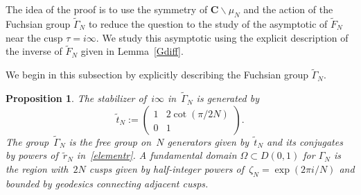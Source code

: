 \documentclass[10pt]{amsart}
\renewcommand\setminus{\smallsetminus}
\def\wGamma{\widetilde{\Gamma}}
\def\wF{\widetilde{F}}
\def\wr{\widetilde{r}}
\def\wt{\widetilde{t}}
\def\SO{\mathrm{SO}}
\def\R{\mathbf{R}}
\newtheorem{proposition}[subsubsection]{Proposition}
\theoremstyle{remark}
\numberwithin{equation}{subsection}
\def\numequation{\addtocounter{subsubsection}{1}\begin{equation}}
\def\C{\mathbf{C}}
\begin{document}
The idea of the proof is to use the symmetry of $\C\setminus \mu_N$ and the action of the Fuchsian group $\wGamma_N$ to reduce the question to the study of the asymptotic of $\wF_N$ near the cusp $\tau= i \infty$. We study this asymptotic using the explicit description of the inverse of $\wF_N$ given in Lemma~\ref{Gdiff}. 

We begin in this subsection by explicitly describing the Fuchsian group $\wGamma_N$. 



\begin{proposition}\label{prop-GammaN}
The stabilizer of~$i \infty$ in~$\wGamma_N$ is generated by
$$\wt_N:=\left( \begin{matrix} 1& 2 \cot(\pi/2N) \\ 0 & 1 \end{matrix} \right).$$
The group~$\wGamma_N$  is the free group on~$N$ generators given by~$\wt_N$ and its conjugates by powers of~$\wr_N$ in~\eqref{elementr}.
A fundamental domain $\Omega\subset D(0,1)$ for $\Gamma_N$ is  the region with~$2N$ cusps given by half-integer powers of~$\zeta_N= \exp(2 \pi i/N)$ and bounded by geodesics connecting adjacent cusps.
\end{proposition}
\end{document}
